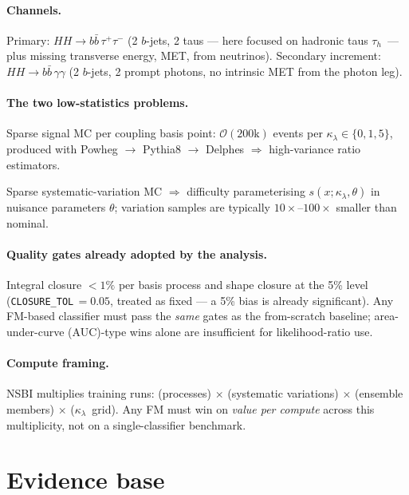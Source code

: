 \documentclass[11pt]{article}
\newcommand{\kl}{\ensuremath{\kappa_\lambda}}
\newcommand{\bbtt}{\ensuremath{b\bar b\,\tau^+\tau^-}}
\newcommand{\bbgg}{\ensuremath{b\bar b\,\gamma\gamma}}
\newcommand{\tauh}{\ensuremath{\tau_h}}
\begin{document}
\paragraph{Channels.} Primary: $HH\to\bbtt$ (2 $b$-jets, 2 taus
--- here focused on hadronic taus \tauh\ --- plus missing transverse
energy, MET, from neutrinos). Secondary increment: $HH\to\bbgg$
(2 $b$-jets, 2 prompt photons, no intrinsic MET from the photon leg).

\paragraph{The two low-statistics problems.}
\begin{description}[leftmargin=2.2em]
\item[P1] Sparse signal MC per coupling basis point:
  $\mathcal{O}(200\mathrm{k})$ events per $\kl\in\{0,1,5\}$, produced with
  Powheg $\to$ Pythia8 $\to$ Delphes $\Rightarrow$ high-variance ratio
  estimators.
\item[P2] Sparse systematic-variation MC $\Rightarrow$ difficulty
  parameterising $s(x;\kl,\theta)$ in nuisance parameters $\theta$;
  variation samples are typically $10\times$--$100\times$ smaller than
  nominal.
\end{description}

\paragraph{Quality gates already adopted by the analysis.}
Integral closure $<1\%$ per basis process and shape closure at the 5\% level
(\texttt{CLOSURE\_TOL}$\,=0.05$, treated as fixed --- a 5\% bias is already
significant). Any FM-based classifier must pass the \emph{same} gates as the
from-scratch baseline; area-under-curve (AUC)-type wins alone are
insufficient for likelihood-ratio use.

\paragraph{Compute framing.} NSBI multiplies training runs:
(processes) $\times$ (systematic variations) $\times$ (ensemble members)
$\times$ (\kl\ grid). Any FM must win on \emph{value per compute} across this
multiplicity, not on a single-classifier benchmark.

\section{Evidence base}
\label{sec:evidence}
\end{document}
